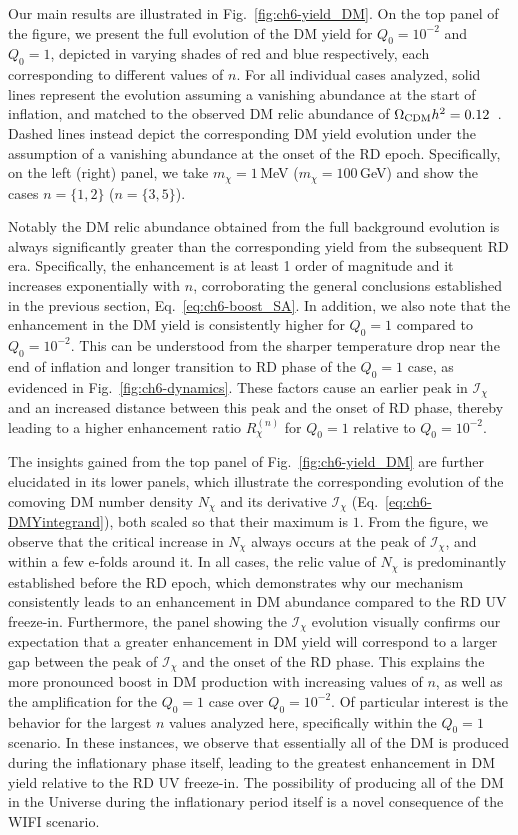 Our main results are illustrated in Fig.~\ref{fig:ch6-yield_DM}. On the top panel of the figure, we present the full evolution of the DM yield for $Q_0=10^{-2}$ and $Q_0=1$, depicted in varying shades of red and blue respectively, each corresponding to different values of $n$. For all individual cases analyzed, solid lines represent the evolution assuming a vanishing abundance at the start of inflation, and matched to the observed DM relic abundance of $\Omega_{\rm{CDM}}h^2=0.12$~\cite{Planck:2018vyg}. Dashed lines instead depict the corresponding DM yield evolution under the assumption of a vanishing abundance at the onset of the RD epoch. Specifically, on the left (right) panel, we take $m_\chi=1\,$MeV ($m_\chi=100\,$GeV) and show the cases $n=\{1,2\}$ ($n=\{3,5\}$).

Notably the DM relic abundance obtained from the full background evolution
is always significantly greater than the corresponding yield from the subsequent RD era. Specifically, the enhancement is at least 1 order of magnitude and it increases exponentially with $n$, corroborating  the general conclusions established in the previous section,  Eq.~\eqref{eq:ch6-boost_SA}.  In addition, we also note that the enhancement in the DM yield is consistently higher for $Q_0=1$ compared to $Q_0=10^{-2}$. This can be understood from the sharper temperature drop near the end of inflation and longer transition to RD phase of the $Q_0=1$ case, as evidenced in Fig.~\ref{fig:ch6-dynamics}. These factors cause an earlier peak in $\mathcal{I}_\chi$ and an increased distance between this peak and the onset of RD phase, thereby leading to a higher enhancement ratio $R^{(n)}_\chi$ for $Q_0=1$ relative to $Q_0=10^{-2}$.


The insights gained from the top panel of Fig.~\ref{fig:ch6-yield_DM} are further elucidated in its lower panels, which illustrate the corresponding evolution of the comoving DM number density $N_\chi$ and its derivative $\mathcal{I}_\chi$ (Eq.~\eqref{eq:ch6-DMYintegrand}), both scaled so that their maximum is $1$. From the figure, we observe that the critical increase in $N_\chi$ always occurs at the peak of $\mathcal{I}_\chi$,  and within a few e-folds around it. In all cases, the relic value of $N_\chi$ is predominantly established before the RD epoch,  which demonstrates why our mechanism consistently leads to an enhancement in DM abundance compared to the RD UV freeze-in. Furthermore, the panel showing the $\mathcal{I}_\chi$ evolution visually confirms our expectation that a greater enhancement in DM yield will correspond to a larger gap between the peak of $\mathcal{I}_\chi$ and the onset of the RD phase. This explains the more pronounced boost in DM production with increasing values of $n$, as well as the amplification for the $Q_0=1$ case over $Q_0=10^{-2}$. Of particular interest is the behavior for the largest  $n$ values analyzed here, specifically within the $Q_0=1$ scenario. In these instances, we observe that essentially all of the DM is produced during the inflationary phase itself, leading to the greatest enhancement in DM yield relative to the RD UV freeze-in.  The possibility of producing all of the DM in the Universe during the inflationary period itself is a novel consequence of the WIFI scenario.

